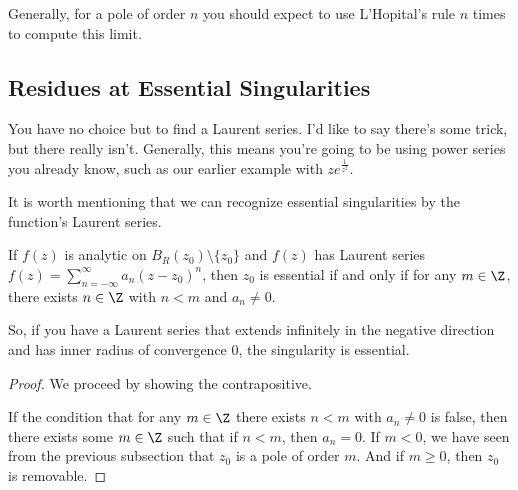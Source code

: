 Generally, for a pole of order $n$ you should expect to use L'Hopital's rule $n$ times to compute this limit.


\subsection{Residues at Essential Singularities}

You have no choice but to find a Laurent series. I'd like to say there's some trick, but there really isn't. Generally, this means you're going to be using power series you already know, such as our earlier example with $ze^{\frac{1}{z^2}}$.

It is worth mentioning that we can recognize essential singularities by the function's Laurent series.

\begin{thmbo}{}{} If $f(z)$ is analytic on $B_R(z_0)\setminus\{z_0\}$ and $f(z)$ has Laurent series $f(z) = \sum_{n = -\infty}^\infty a_n(z-z_0)^n$, then $z_0$ is essential if and only if for any $m\in \Z$, there exists $n\in \Z$ with $n < m$ and $a_n \ne 0$.
\end{thmbo}

So, if you have a Laurent series that extends infinitely in the negative direction and has inner radius of convergence $0$, the singularity is essential.

\begin{proof} We proceed by showing the contrapositive.

If the condition that for any $m\in\Z$ there exists $n< m$ with $a_n \ne 0$ is false, then there exists some $m \in \Z$ such that if $n < m$, then $a_n = 0$. If $m < 0$, we have seen from the previous subsection that $z_0$ is a pole of order $m$. And if $m\ge 0$, then $z_0$ is removable.
\end{proof}